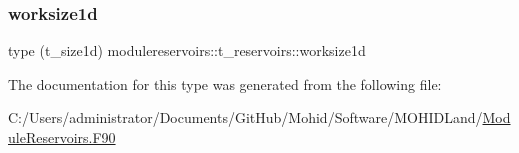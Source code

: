 \subsubsection{\texorpdfstring{worksize1d}{worksize1d}}
{\footnotesize\ttfamily type (t\+\_\+size1d) modulereservoirs\+::t\+\_\+reservoirs\+::worksize1d\hspace{0.3cm}{\ttfamily [private]}}



The documentation for this type was generated from the following file\+:\begin{DoxyCompactItemize}
\item 
C\+:/\+Users/administrator/\+Documents/\+Git\+Hub/\+Mohid/\+Software/\+M\+O\+H\+I\+D\+Land/\mbox{\hyperlink{_module_reservoirs_8_f90}{Module\+Reservoirs.\+F90}}\end{DoxyCompactItemize}
